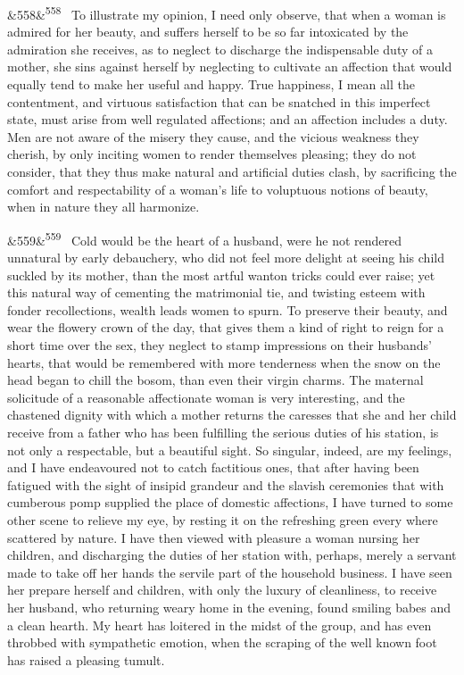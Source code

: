 \documentclass[12pt]{article}
\newcommand{\para}[1][]{\par\noindent\ifx&#1&\else\textsuperscript{\footnotesize #1}~\fi}
\begin{document}
\para[558] To illustrate my opinion, I need only observe, that when a woman is admired for her beauty, and suffers herself to be so far intoxicated by the admiration she receives, as to neglect to discharge the indispensable duty of a mother, she sins against herself by neglecting to cultivate an affection that would equally tend to make her useful and happy. True happiness, I mean all the contentment, and virtuous satisfaction that can be snatched in this imperfect state, must arise from well regulated affections; and an affection includes a duty. Men are not aware of the misery they cause, and the vicious weakness they cherish, by only inciting women to render themselves pleasing; they do not consider, that they thus make natural and artificial duties clash, by sacrificing the comfort and respectability of a woman's life to voluptuous notions of beauty, when in nature they all harmonize.

\para[559] Cold would be the heart of a husband, were he not rendered unnatural by early debauchery, who did not feel more delight at seeing his child suckled by its mother, than the most artful wanton tricks could ever raise; yet this natural way of cementing the matrimonial tie, and twisting esteem with fonder recollections, wealth leads women to spurn. To preserve their beauty, and wear the flowery crown of the day, that gives them a kind of right to reign for a short time over the sex, they neglect to stamp impressions on their husbands' hearts, that would be remembered with more tenderness when the snow on the head began to chill the bosom, than even their virgin charms. The maternal solicitude of a reasonable affectionate woman is very interesting, and the chastened dignity with which a mother returns the caresses that she and her child receive from a father who has been fulfilling the serious duties of his station, is not only a respectable, but a beautiful sight. So singular, indeed, are my feelings, and I have endeavoured not to catch factitious ones, that after having been fatigued with the sight of insipid grandeur and the slavish ceremonies that with cumberous pomp supplied the place of domestic affections, I have turned to some other scene to relieve my eye, by resting it on the refreshing green every where scattered by nature. I have then viewed with pleasure a woman nursing her children, and discharging the duties of her station with, perhaps, merely a servant made to take off her hands the servile part of the household business. I have seen her prepare herself and children, with only the luxury of cleanliness, to receive her husband, who returning weary home in the evening, found smiling babes and a clean hearth. My heart has loitered in the midst of the group, and has even throbbed with sympathetic emotion, when the scraping of the well known foot has raised a pleasing tumult.
\end{document}
